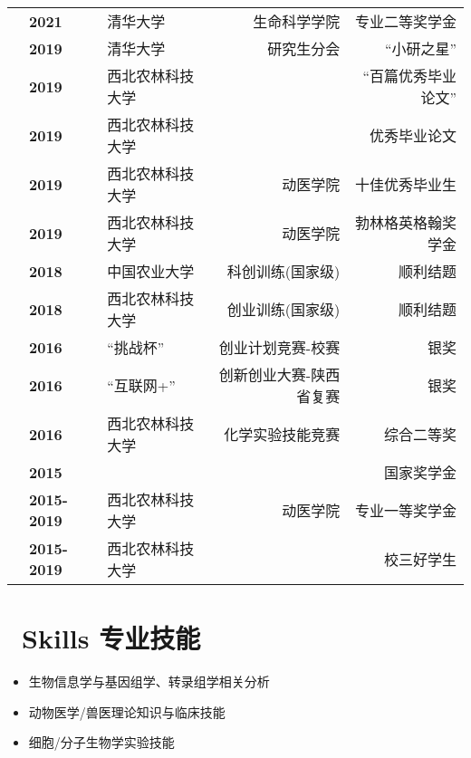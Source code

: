 \documentclass{resume}
\begin{document}
	\begin{tabularx}{\textwidth}{@{}l X l r r@{}}
	&	\textbf{2021} & {清华大学} & 生命科学学院  & 专业二等奖学金 \\
	&	\textbf{2019} & {清华大学} & 研究生分会  &``小研之星'' \\
	&	\textbf{2019} & {西北农林科技大学} &   &``百篇优秀毕业论文'' \\
	&	\textbf{2019} & {西北农林科技大学} &   &优秀毕业论文 \\
	&	\textbf{2019} & {西北农林科技大学} &  动医学院 &十佳优秀毕业生 \\
	&	\textbf{2019} & {西北农林科技大学} &  动医学院 & 勃林格英格翰奖学金 \\
	&	\textbf{2018} & {中国农业大学} &  科创训练(国家级) & 顺利结题 \\
	&	\textbf{2018} & {西北农林科技大学} &  创业训练(国家级) & 顺利结题 \\
	&	\textbf{2016} & {``挑战杯''} & 创业计划竞赛-校赛 & 银奖 \\
	&	\textbf{2016} & {``互联网+''} &  创新创业大赛-陕西省复赛 & 银奖 \\
	&	\textbf{2016} & {西北农林科技大学} &  化学实验技能竞赛 & 综合二等奖 \\
	&	\textbf{2015} &  &   & 国家奖学金 \\
	&	\textbf{2015-2019} & 西北农林科技大学  & 动医学院  & 专业一等奖学金 \\
	&	\textbf{2015-2019} & 西北农林科技大学  &   & 校三好学生 \\
	\end{tabularx}
	
	
	\section{\faCogs\ Skills 专业技能}
	\begin{itemize}[parsep=0.5ex]
		\item 生物信息学与基因组学、转录组学相关分析
		\item 动物医学/兽医理论知识与临床技能
		\item 细胞/分子生物学实验技能
	\end{itemize}
	
	
%	
\end{document}
